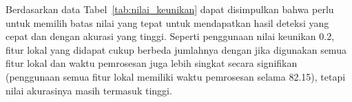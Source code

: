 Berdasarkan data Tabel~\ref{tab:nilai_keunikan} dapat disimpulkan bahwa perlu untuk memilih batas nilai yang tepat untuk mendapatkan hasil deteksi yang cepat dan dengan akurasi yang tinggi. Seperti penggunaan nilai keunikan 0.2, fitur lokal yang didapat cukup berbeda jumlahnya dengan jika digunakan semua fitur lokal dan waktu pemrosesan juga lebih singkat secara signifikan (penggunaan semua fitur lokal memiliki waktu pemrosesan selama 82.15), tetapi nilai akurasinya masih termasuk tinggi.



%
%
